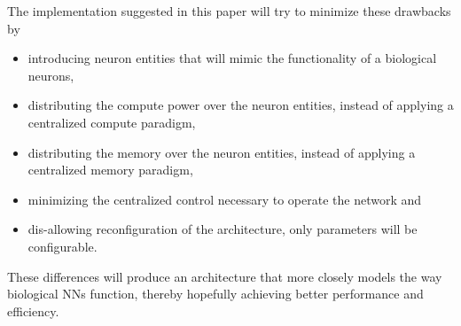 The implementation suggested in this paper will try to minimize these drawbacks by
\begin{itemize}
  \item introducing neuron entities that will mimic the functionality of a biological neurons,
  \item distributing the compute power over the neuron entities, instead of applying a centralized compute paradigm,
  \item distributing the memory over the neuron entities, instead of applying a centralized memory paradigm,
  \item minimizing the centralized control necessary to operate the network and
  \item dis-allowing reconfiguration of the architecture, only parameters will be configurable.
\end{itemize}
These differences will produce an architecture that more closely models the way biological \acp{NN} function, thereby hopefully achieving better performance and efficiency.
